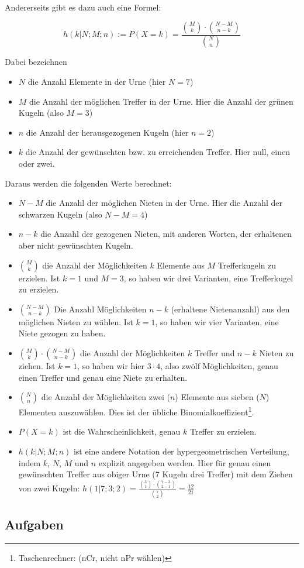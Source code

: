 Andererseits gibt es dazu auch eine Formel:

$$h(k|N;M;n) := P(X=k) = \frac{ {M\choose k} \cdot{} {{N-M}\choose {n-k}}}{{N \choose n}}$$

Dabei bezeichnen
\begin{itemize}
\item $N$ die Anzahl Elemente in der Urne (hier $N = 7$)
\item $M$ die Anzahl der möglichen Treffer in der Urne. Hier die Anzahl der grünen Kugeln (also $M = 3$)
\item $n$ die Anzahl der herausgezogenen Kugeln (hier $n = 2$)
\item $k$ die Anzahl der gewünschten bzw. zu erreichenden Treffer. Hier \zB null, einen oder zwei.
\end{itemize}
\newpage


Daraus werden die folgenden Werte berechnet:

\begin{itemize}
\item $N-M$ die Anzahl der möglichen Nieten in der Urne. Hier die Anzahl der schwarzen Kugeln (also $N-M = 4$)
\item $n-k$ die Anzahl der gezogenen Nieten, mit anderen Worten, der erhaltenen aber nicht gewünschten Kugeln.
\item $M\choose k$ die Anzahl der Möglichkeiten $k$ Elemente aus $M$ Trefferkugeln zu erzielen. Ist \zB $k=1$ und $M=3$, so haben wir drei Varianten, eine Trefferkugel zu erzielen.
\item ${N-M}\choose {n-k}$ Die Anzahl Möglichkeiten $n-k$ (erhaltene Nietenanzahl) aus den möglichen Nieten zu wählen. Ist \zB $k=1$, so haben wir vier Varianten, eine Niete gezogen zu haben.
\item ${M\choose k} \cdot{} {{N-M}\choose {n-k}}$ die Anzahl der Möglichkeiten $k$ Treffer und $n-k$ Nieten zu ziehen. Ist \zB $k=1$, so haben wir hier $3\cdot{}4$, also zwölf Möglichkeiten, genau einen Treffer und genau eine Niete zu erhalten.
\item $N \choose n$ die Anzahl der Möglichkeiten zwei ($n$) Elemente
  aus sieben ($N$) Elementen auszuwählen. Dies ist der übliche
  Binomialkoeffizient\footnote{Taschenrechner:  (nCr, nicht nPr wählen)}.
\item $P(X=k)$ ist die Wahrscheinlichkeit, genau $k$ Treffer zu erzielen.
\item $h(k|N;M;n)$ ist eine andere Notation der hypergeometrischen Verteilung, indem $k$, $N$, $M$ und $n$ explizit angegeben werden. Hier \zB für genau einen gewünschten Treffer aus obiger Urne (7 Kugeln drei Treffer) mit dem Ziehen von zwei Kugeln: $h(1|7;3;2)=\frac{{3 \choose 1} \cdot{} {{7-3}\choose {2-1}  }   }{{ 7 \choose 2 }}=\frac{12}{21}$
\end{itemize}

\subsection*{Aufgaben}

\newpage

